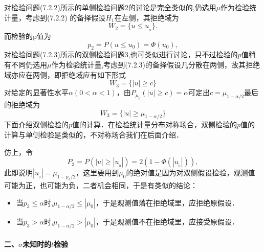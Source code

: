 对检验问题(7.2.2)所示的单侧检验问题2的讨论是完全类似的,仍选用$\mu$作为检验统计量，考虑到(7.2.2) 的备择假设$H_1$在左侧，其拒绝域为
\begin{equation}
    W_{2}=\{u\leq u_{_\alpha}\}.
\end{equation}
而检验的p值为
\begin{equation}p_{2}=P(u\leq u_0)=\Phi(u_0),\end{equation}
对检验间题(7.2.3)所示的双侧检验问题3,也可类似进行讨论，只不过检验的$p$值稍有不同仍选用$\mu$作为检验统计量,考虑到(7.2.3)的备择假设几分散在两侧，故其拒绝域亦应在两侧，即拒绝域应有如下形式
$$W_3=\{|u|\geqslant c\}$$
对给定的显著性水平$\alpha (0<\alpha<1)$，由$P_{\mu_{0}}(|u\mid\geq c)=\alpha $可定出$c=\mu_{1-\alpha/2}$最后的拒绝域为
\begin{equation}
    W_3=\{|u|\geqslant \mu_{1-\alpha/2}\}
\end{equation}
下面介绍双侧检验的$p$值的计算．在检验统计量分布对称场合，双侧检验的$p$值的计算与单侧检验是类似的，不对称场合我们在后面介绍．

仿上，令
\begin{equation}P_{3}=P(|u|\geqslant|u_{_0}|)=2(1-\Phi(|u_{_0}|)),\end{equation}
此即说明$|u_{_0}|=\mu_{1-p_{3}/2}$，这里要用到$\mu_0$的绝对值是因为对双侧假设检验，观测值可能为正，也可能为负，二者机会相同，于是有类似的结论：
\begin{itemize}
    \item 当$p_3 \leq \alpha$时,$\mu_{1-\alpha/2} \leq |\mu_0|$，于是观测值落在拒绝域里，应拒绝原假设．
    \item 当$p_3 > \alpha$时,$\mu_{1-\alpha/2} > |\mu_0|$，于是观测值不在拒绝域里，应接受原假设．
\end{itemize}

\paragraph{二、$\sigma$未知时的$t$检验}~{}

